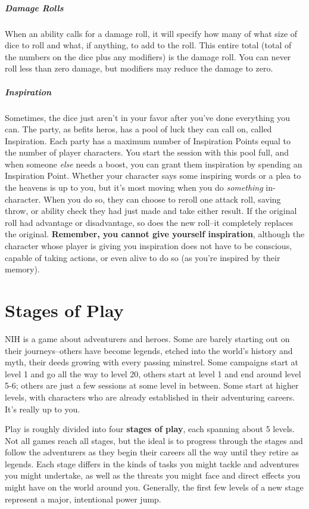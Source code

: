 \subparagraph*{Damage Rolls} When an ability calls for a damage roll, it will specify how many of what size of dice to roll and what, if anything, to add to the roll. This entire total (total of the numbers on the dice plus any modifiers) is the damage roll. You can never roll less than zero damage, but modifiers may reduce the damage to zero.

\subparagraph*{Inspiration} Sometimes, the dice just aren't in your favor after you've done everything you can. The party, as befits heros, has a pool of luck they can call on, called Inspiration. Each party has a maximum number of Inspiration Points equal to the number of player characters. You start the session with this pool full, and when someone \textit{else} needs a boost, you can grant them inspiration by spending an Inspiration Point. Whether your character says some inspiring words or a plea to the heavens is up to you, but it's most moving when you do \textit{something} in-character. When you do so, they can choose to reroll one attack roll, saving throw, or ability check they had just made and take either result. If the original roll had advantage or disadvantage, so does the new roll--it completely replaces the original. \textbf{Remember, you cannot give yourself inspiration}, although the character whose player is giving you inspiration does not have to be conscious, capable of taking actions, or even alive to do so (as you're inspired by their memory).

\section{Stages of Play}\label{sec:stages-of-play}
NIH is a game about adventurers and heroes. Some are barely starting out on their journeys--others have become legends, etched into the world's history and myth, their deeds growing with every passing minstrel. Some campaigns start at level 1 and go all the way to level 20, others start at level 1 and end around level 5-6; others are just a few sessions at some level in between. Some start at higher levels, with characters who are already established in their adventuring careers. It's really up to you.

Play is roughly divided into four \textbf{stages of play}, each spanning about 5 levels. Not all games reach all stages, but the ideal is to progress through the stages and follow the adventurers as they begin their careers all the way until they retire as legends. Each stage differs in the kinds of tasks you might tackle and adventures you might undertake, as well as the threats you might face and direct effects you might have on the world around you. Generally, the first few levels of a new stage represent a major, intentional power jump.

